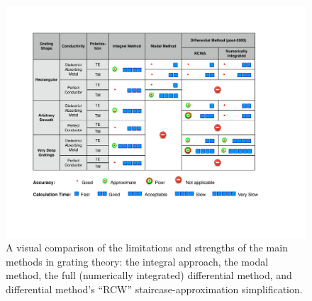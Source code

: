 \documentclass[singlespace,proposal]{uofsthesis-cs}
\begin{document}
\begin{figure}[htbp] %
   \centering
   \includegraphics[scale=0.8]{../data/Chapter2/2e_methodComparision/methodComparisonTable_noPre2000.pdf} 
   \caption{A visual comparison of the limitations and strengths of the main methods in grating theory: the integral approach, the modal method, the full (numerically integrated) differential method, and differential method's ``RCW'' staircase-approximation simplification.}
   \label{2e}
\end{figure}


\end{document}
